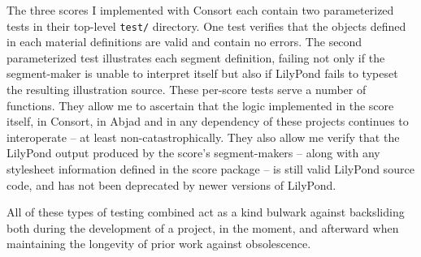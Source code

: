 The three scores I implemented with Consort each contain two parameterized
tests in their top-level \texttt{test/} directory. One test verifies that the
objects defined in each material definitions are valid and contain no errors.
The second parameterized test illustrates each segment definition, failing not
only if the segment-maker is unable to interpret itself but also if LilyPond
fails to typeset the resulting illustration source. These per-score tests serve
a number of functions. They allow me to ascertain that the logic implemented in
the score itself, in Consort, in Abjad and in any dependency of these projects
continues to interoperate -- at least non-catastrophically. They also allow me
verify that the LilyPond output produced by the score's segment-makers -- along
with any stylesheet information defined in the score package -- is still valid
LilyPond source code, and has not been deprecated by newer versions of
LilyPond.

All of these types of testing combined act as a kind bulwark against
backsliding both during the development of a project, in the moment, and
afterward when maintaining the longevity of prior work against obsolescence.


%
%
%
%
%
%
%

